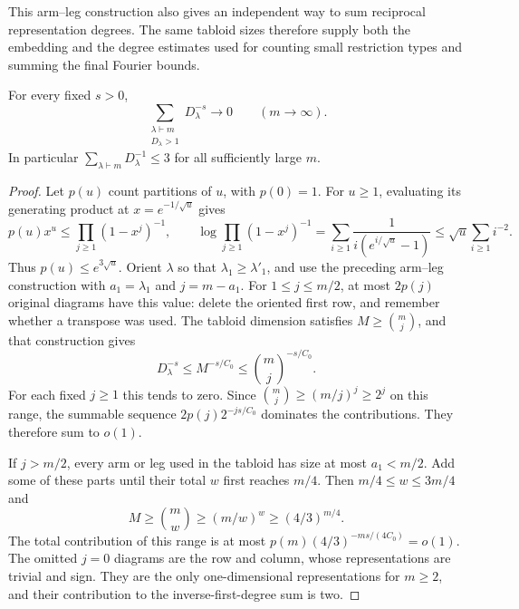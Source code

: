 This arm--leg construction also gives an independent way to sum reciprocal
representation degrees. The same tabloid sizes therefore supply both
the embedding and the degree estimates used for counting small
restriction types and summing the final Fourier bounds.

\begin{lemma}
\label{l:tabloid-degree-sums}
For every fixed $s>0$,
\[
 \sum_{\substack{\lambda\vdash m\\D_\lambda>1}}
             D_\lambda^{-s}\longrightarrow0
 \qquad(m\longrightarrow\infty).
\]
In particular $\sum_{\lambda\vdash m}D_\lambda^{-1}\le3$ for all
sufficiently large $m$.
\end{lemma}

\begin{proof}
Let $p(u)$ count partitions of $u$, with $p(0)=1$.
For $u\ge1$, evaluating its generating product at $x=e^{-1/\sqrt u}$
gives
\[
 p(u)x^u\le\prod_{j\ge1}(1-x^j)^{-1},\qquad
 \log\prod_{j\ge1}(1-x^j)^{-1}
 =\sum_{i\ge1}\frac1{i(e^{i/\sqrt u}-1)}
 \le\sqrt u\sum_{i\ge1}i^{-2}.
\]
Thus $p(u)\le e^{3\sqrt u}$.
Orient $\lambda$ so that $\lambda_1\ge\lambda'_1$, and use the
preceding arm--leg construction with $a_1=\lambda_1$ and $j=m-a_1$.
For $1\le j\le m/2$, at most $2p(j)$ original
diagrams have this value: delete the oriented first row, and remember
whether a transpose was used.  The tabloid dimension satisfies
$M\ge\binom mj$, and that construction gives
\[
 D_\lambda^{-s}\le M^{-s/C_0}\le\binom mj^{-s/C_0}.
\]
For each fixed $j\ge1$ this tends to zero.  Since
$\binom mj\ge(m/j)^j\ge2^j$ on this range, the summable sequence
$2p(j)2^{-js/C_0}$ dominates the contributions.  They therefore sum
to $o(1)$.

If $j>m/2$, every arm or leg used in the tabloid has size at most
$a_1<m/2$.  Add some of these parts until their total $w$ first
reaches $m/4$.  Then $m/4\le w\le3m/4$ and
\[
 M\ge\binom mw\ge(m/w)^w\ge(4/3)^{m/4}.
\]
The total contribution of this range is at most
$p(m)(4/3)^{-ms/(4C_0)}=o(1)$.
The omitted $j=0$ diagrams are the row and column, whose
representations are trivial and sign.  They are the only
one-dimensional representations for $m\ge2$, and their contribution
to the inverse-first-degree sum is two.
\end{proof}
